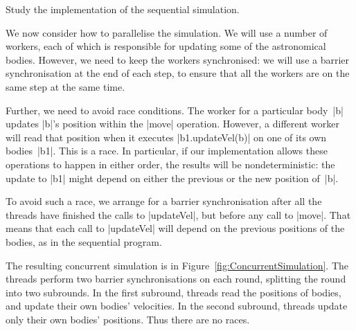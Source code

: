 
\begin{instruction}
Study the implementation of the sequential simulation.
\end{instruction}

We now consider how to parallelise the simulation.  We will use a number of
workers, each of which is responsible for updating some of the astronomical
bodies.  However, we need to keep the workers synchronised: we will use a
barrier synchronisation at the end of each step, to ensure that all the
workers are on the same step at the same time.  

Further, we need to avoid race conditions.  The worker for a particular
body~|b| updates |b|'s position within the |move| operation.  However, a
different worker will read that position when it executes |b1.updateVel(b)| on
one of its own bodies~|b1|.  This is a race.  In particular, if our
implementation allows these operations to happen in either order, the results
will be nondeterministic: the update to |b1| might depend on either the
previous or the new position of~|b|.

To avoid such a race, we arrange for a barrier synchronisation after all the
threads have finished the calls to |updateVel|, but before any call to
|move|.  That means that each call to |updateVel| will depend on the previous
positions of the bodies, as in the sequential program. 

The resulting concurrent simulation is in
Figure~\ref{fig:ConcurrentSimulation}.  The threads perform two barrier
synchronisations on each round, splitting the round into two subrounds.  In
the first subround, threads read the positions of bodies, and update their own
bodies' velocities.  In the second subround, threads update only their own
bodies' positions.  Thus there are no races. 


